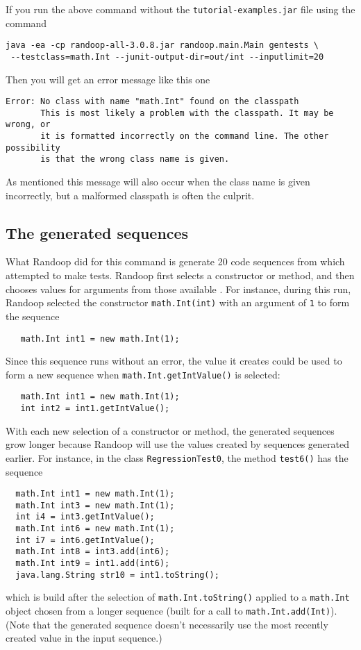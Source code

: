 \documentclass[11pt, oneside]{article} %
\newcommand{\code}[1]{{\texttt{#1}}}
\newcommand{\cmd}[1]{{\texttt{#1}}}
\begin{document}
If you run the above command without the \texttt{tutorial-examples.jar} file using the command
\begin{verbatim}
java -ea -cp randoop-all-3.0.8.jar randoop.main.Main gentests \
 --testclass=math.Int --junit-output-dir=out/int --inputlimit=20
\end{verbatim}
Then you will get an error message like this one
\begin{verbatim}
Error: No class with name "math.Int" found on the classpath
       This is most likely a problem with the classpath. It may be wrong, or
       it is formatted incorrectly on the command line. The other possibility
       is that the wrong class name is given.
\end{verbatim}
As mentioned this message will also occur when the class name is given incorrectly, but a malformed classpath is often the culprit.


\subsection{The generated sequences}
What Randoop did for this command is generate 20 code sequences from which attempted to make tests. 
Randoop first selects a constructor or method, and then chooses values for arguments from those available .
For instance, during this run, Randoop selected the constructor \code{math.Int(int)} with an argument of \code{1} to form the sequence
\begin{verbatim}
   math.Int int1 = new math.Int(1);
\end{verbatim}
Since this sequence runs without an error, the value it creates could be used to form a new sequence when \code{math.Int.getIntValue()} is selected:
\begin{verbatim}
   math.Int int1 = new math.Int(1);
   int int2 = int1.getIntValue();
\end{verbatim}
With each new selection of a constructor or method, the generated sequences grow longer because Randoop will use the values created by sequences generated earlier. 
For instance, in the class \code{RegressionTest0}, the method \cmd{test6()} has the sequence
\begin{verbatim}
  math.Int int1 = new math.Int(1);
  math.Int int3 = new math.Int(1);
  int i4 = int3.getIntValue();
  math.Int int6 = new math.Int(1);
  int i7 = int6.getIntValue();
  math.Int int8 = int3.add(int6);
  math.Int int9 = int1.add(int6);
  java.lang.String str10 = int1.toString();
\end{verbatim}
which is build after the selection of \code{math.Int.toString()} applied to a \code{math.Int} object chosen from a longer sequence (built for a call to \code{math.Int.add(Int)}).
(Note that the generated sequence doesn't necessarily use the most recently created value in the input sequence.)
\end{document}
